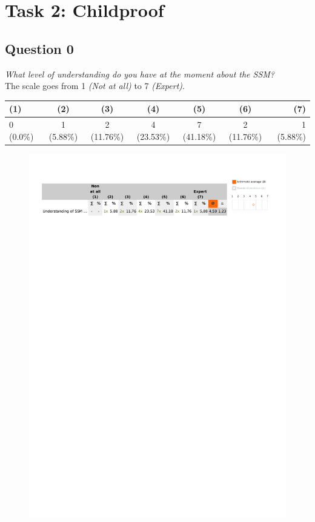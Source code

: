 \section{Task 2: Childproof} %
\label{sec:res_childproof_task}

\subsection{Question 0}\label{question2:0}
\emph{What level of understanding do you have at the moment about the SSM?}\\

The scale goes from 1 \emph{(Not at all)} to 7 \emph{(Expert)}.
\begin{table}[H]
	\begin{center}
		\small \begin{tabular*}{1.15\columnwidth}{lcccccr}
			\\ \hline \hline
			(1) & (2) & (3) & (4) & (5) & (6) & (7) \\ \hline \hline

		 	0 (0.0\%) & 1 (5.88\%) & 2 (11.76\%) & 4 (23.53\%) & 7 (41.18\%) & 2 (11.76\%) & 1 (5.88\%)\\ \hline
		\end{tabular*}
	\end{center}
\end{table}

\begin{figure}[H]
	\centering
	\includegraphics[width=0.6\linewidth]{gfx/Chapter_EvaluationResults/ChildproofTask/question0}
\end{figure}

